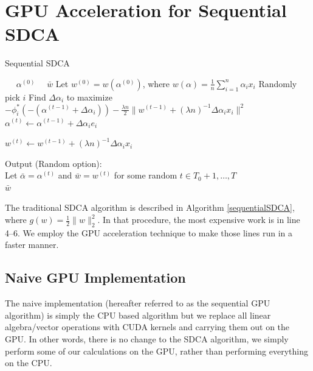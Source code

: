 \documentclass{article}
\begin{document}
\section{GPU Acceleration for Sequential SDCA}
\begin{algorithm}[H]
	\caption{Sequential SDCA}
	\label{sequentialSDCA}
	\begin{algorithmic}[1]
	\REQUIRE~~ $\alpha^{(0)}$
		\ENSURE~~$\bar{w}$
		\STATE Let $w^{(0)}=w(\alpha^{(0)})$, where $w(\alpha)=\frac{1}{n}\sum_{i=1}^{n}\alpha_ix_i$
		\STATE Randomly pick $i$
		\STATE Find $\Delta\alpha_i$ to maximize $-\phi_i^*(-(\alpha^{(t-1)}+\Delta\alpha_i))-\frac{\lambda n}{2}\|w^{(t-1)}+(\lambda n)^{-1}\Delta \alpha_i x_i\|^2$
		\STATE $\alpha^{(t)}\leftarrow\alpha^{(t-1)}+\Delta\alpha_ie_i$
		
		\STATE $w^{(t)}\leftarrow w^{(t-1)}+(\lambda n)^{-1}\Delta\alpha_i x_i$
		\ENDFOR
		
		\STATE Output (Random option):\\
		Let $\bar{\alpha}=\alpha^{(t)}$ and $\bar{w}=w^{(t)}$ for some random $t\in T_0+1,\ldots,T$\\
		\RETURN $\bar{w}$
		
	\end{algorithmic}
\end{algorithm}
The traditional SDCA algorithm \cite{shalev2013stochastic} is described in Algorithm \ref{sequentialSDCA}, where $g(w)=\frac{1}{2}\|w\|_2^2$.
In that procedure, the most expensive work is in line 4--6. We employ the GPU acceleration technique to make those lines run in a faster manner.
\subsection{Naive GPU Implementation}
The naive implementation (hereafter referred to as the sequential GPU algorithm)
is simply the CPU based algorithm but we replace all linear algebra/vector
operations with CUDA kernels and carrying them out on the GPU. In other words,
there is no change to the SDCA algorithm, we simply perform some of our
calculations on the GPU, rather than performing everything on the CPU.
\end{document}
